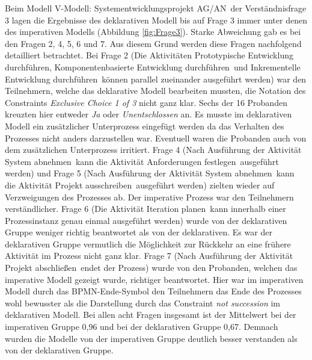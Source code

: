 Beim Modell \grqq V-Modell: Systementwicklungsprojekt AG/AN\grqq \ der Verständnisfrage 3 lagen die Ergebnisse des deklarativen Modell bis auf Frage 3 immer unter denen des imperativen Modells (Abbildung \ref{fig:Frage3}). Starke Abweichung gab es bei den Fragen 2, 4, 5, 6 und 7. Aus diesem Grund werden diese Fragen nachfolgend detailliert betrachtet. \newline
Bei Frage 2 (\grqq Die Aktivitäten \grqq Prototypische Entwicklung durchführen\grqq, \grqq Komponentenbasierte Entwicklung durchführen\grqq \ und \grqq Inkrementelle Entwicklung durchführen\grqq \ können parallel zueinander ausgeführt werden\grqq) war den Teilnehmern, welche das deklarative Modell bearbeiten mussten, die Notation des Constraints \textit {Exclusive Choice 1 of 3} nicht ganz klar. Sechs der 16 Probanden kreuzten hier entweder \textit{Ja} oder \textit{Unentschlossen} an. Es musste im deklarativen Modell ein zusätzlicher Unterprozess eingefügt werden da das Verhalten des Prozesses nicht anders darzustellen war. Eventuell waren die Probanden auch von dem zusätzlichen Unterprozess irritiert.\newline
Frage 4 (\grqq Nach Ausführung der Aktivität \grqq System abnehmen\grqq \ kann die Aktivität \grqq Anforderungen festlegen\grqq \ ausgeführt werden\grqq) und Frage 5 (\grqq Nach Ausführung der Aktivität \grqq System abnehmen\grqq \ kann die Aktivität \grqq Projekt ausschreiben\grqq \ ausgeführt werden\grqq) zielten wieder auf Verzweigungen des Prozesses ab. Der imperative Prozess war den Teilnehmern verständlicher. \newline
Frage 6 (\grqq Die Aktivität \grqq Iteration planen\grqq \ kann innerhalb einer Prozessinstanz genau einmal ausgeführt werden\grqq) wurde von der deklarativen Gruppe weniger richtig beantwortet als von der deklarativen. Es war der deklarativen Gruppe vermutlich die Möglichkeit zur Rückkehr an eine frühere Aktivität im Prozess nicht ganz klar. \newline
Frage 7 (\grqq Nach Ausführung der Aktivität \grqq Projekt abschließen\grqq \ endet der Prozess\grqq) wurde von den Probanden, welchen das imperative Modell gezeigt wurde, richtiger beantwortet. Hier war im imperativen Modell durch das BPMN-Ende-Symbol den Teilnehmern das Ende des Prozesses wohl bewusster als die Darstellung durch das Constraint \textit{not succession} im deklarativen Modell.\newline
Bei allen acht Fragen insgesamt ist der Mittelwert bei der imperativen Gruppe 0,96 und bei der deklarativen Gruppe 0,67. Demnach wurden die Modelle von der imperativen Gruppe deutlich besser verstanden als von der deklarativen Gruppe. \newline


